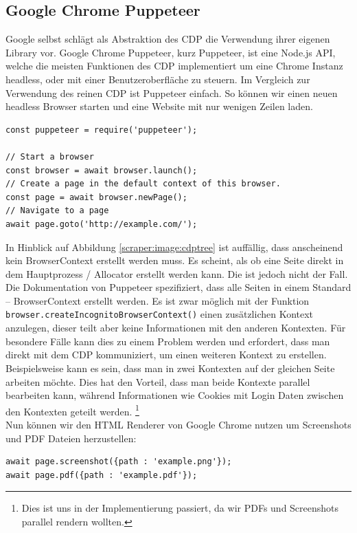 \subsection*{Google Chrome Puppeteer} \label{scraper:subsec:puppeteer}
Google selbst schlägt als Abstraktion des \ac{CDP} die Verwendung ihrer eigenen Library vor. Google Chrome Puppeteer, kurz Puppeteer, ist eine Node.js API, welche die meisten Funktionen des \ac{CDP} implementiert um eine Chrome Instanz headless, oder mit einer Benutzeroberfläche zu steuern. \cite{puppeteer} Im Vergleich zur Verwendung des reinen \ac{CDP} ist Puppeteer einfach. So können wir einen neuen headless Browser starten und eine Website mit nur wenigen Zeilen laden.
\begin{verbatim}
const puppeteer = require('puppeteer');

// Start a browser
const browser = await browser.launch(); 
// Create a page in the default context of this browser.
const page = await browser.newPage();  
// Navigate to a page
await page.goto('http://example.com/'); 
\end{verbatim}
In Hinblick auf Abbildung \ref{scraper:image:cdptree} ist auffällig, dass anscheinend kein BrowserContext erstellt werden muss. Es scheint, als ob eine Seite direkt in dem Hauptprozess / Allocator erstellt werden kann. Die ist jedoch nicht der Fall. Die Dokumentation von Puppeteer spezifiziert, dass alle Seiten in einem Standard – BrowserContext erstellt werden. Es ist zwar möglich mit der Funktion \texttt{browser.createIncognitoBrowserContext()} einen zusätzlichen Kontext anzulegen, dieser teilt aber keine Informationen mit den anderen Kontexten. Für besondere Fälle kann dies zu einem Problem werden und erfordert, dass man direkt mit dem CDP kommuniziert, um einen weiteren Kontext zu erstellen. Beispielsweise kann es sein, dass man in zwei Kontexten auf der gleichen Seite arbeiten möchte. Dies hat den Vorteil, dass man beide Kontexte parallel bearbeiten kann, während Informationen wie Cookies mit Login Daten zwischen den Kontexten geteilt werden. \footnote{Dies ist uns in der Implementierung passiert, da wir PDFs und Screenshots parallel rendern wollten.} \\
Nun können wir den HTML Renderer von Google Chrome nutzen um Screenshots und PDF Dateien herzustellen:  
\begin{verbatim}
await page.screenshot({path : 'example.png'});
await page.pdf({path : 'example.pdf'});
\end{verbatim}